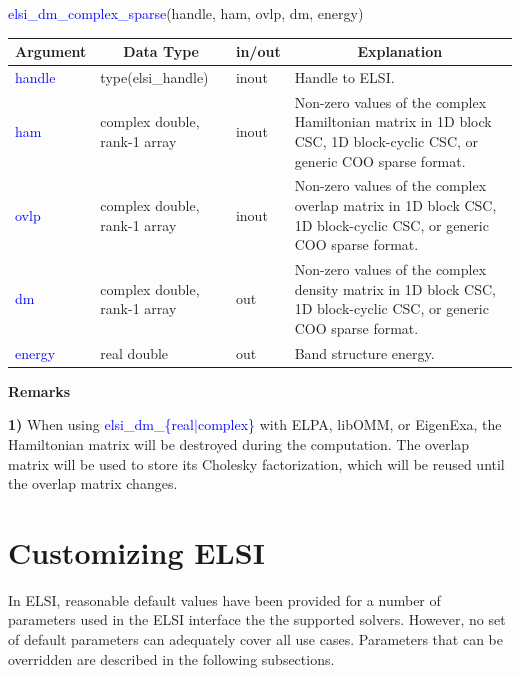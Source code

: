 \documentclass{report}
\newcommand{\tcb}[1]{\textcolor{blue}{#1}}
\begin{document}
\begin{labeling}{\hspace{6cm}}
\item [\hspace{0.3cm} \tcb{elsi\_dm\_complex\_sparse}(handle, ham, ovlp, dm, energy)]
\end{labeling}

\begin{tabular}[]{|p{20mm}|p{45mm}|p{15mm}|p{85mm}|}
\hline
\multicolumn{1}{|c|}{\textbf{Argument}} & \multicolumn{1}{c|}{\textbf{Data Type}} & \multicolumn{1}{c|}{\textbf{in/out}} & \multicolumn{1}{c|}{\textbf{Explanation}}\\
\hline
\tcb{handle} & type(elsi\_handle)           & inout & Handle to ELSI.\\
\hline
\tcb{ham}    & complex double, rank-1 array & inout & Non-zero values of the complex Hamiltonian matrix in 1D block CSC, 1D block-cyclic CSC, or generic COO sparse format.\\
\hline
\tcb{ovlp}   & complex double, rank-1 array & inout & Non-zero values of the complex overlap matrix in 1D block CSC, 1D block-cyclic CSC, or generic COO sparse format.\\
\hline
\tcb{dm}     & complex double, rank-1 array & out   & Non-zero values of the complex density matrix in 1D block CSC, 1D block-cyclic CSC, or generic COO sparse format.\\
\hline
\tcb{energy} & real double                  & out   & Band structure energy.\\
\hline
\end{tabular}

\textbf{Remarks}

\textbf{1)} When using \tcb{elsi\_dm\_\{real$\vert$complex\}} with ELPA, libOMM, or EigenExa, the Hamiltonian matrix will be destroyed during the computation. The overlap matrix will be used to store its Cholesky factorization, which will be reused until the overlap matrix changes.

\section{Customizing ELSI}
\label{sec:setter}
In ELSI, reasonable default values have been provided for a number of parameters used in the ELSI interface the the supported solvers. However, no set of default parameters can adequately cover all use cases. Parameters that can be overridden are described in the following subsections.
\end{document}
